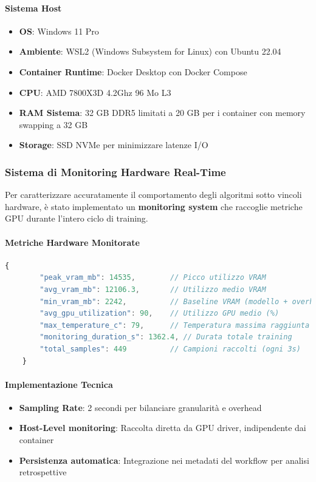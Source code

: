 \paragraph{Sistema Host}
\begin{itemize}
	\item \textbf{OS}: Windows 11 Pro
	\item \textbf{Ambiente}: WSL2 (Windows Subsystem for Linux) con Ubuntu 22.04
	\item \textbf{Container Runtime}: Docker Desktop con Docker Compose
	\item \textbf{CPU}: AMD 7800X3D 4.2Ghz 96 Mo L3 
	\item \textbf{RAM Sistema}: 32 GB DDR5 limitati a 20 GB per i container con memory swapping a 32 GB
	\item \textbf{Storage}: SSD NVMe per minimizzare latenze I/O
\end{itemize}

\subsubsection{Sistema di Monitoring Hardware Real-Time}
\label{subsubsec:monitoring_hardware}

Per caratterizzare accuratamente il comportamento degli algoritmi sotto vincoli hardware, è stato implementato un \textbf{monitoring system} che raccoglie metriche GPU durante l'intero ciclo di training.

\paragraph{Metriche Hardware Monitorate}
\begin{lstlisting}[language=JavaScript, caption=Esempio statistiche hardware raccolte]
	{
		"peak_vram_mb": 14535,        // Picco utilizzo VRAM
		"avg_vram_mb": 12106.3,       // Utilizzo medio VRAM
		"min_vram_mb": 2242,          // Baseline VRAM (modello + overhead)
		"avg_gpu_utilization": 90,    // Utilizzo GPU medio (%)
		"max_temperature_c": 79,      // Temperatura massima raggiunta
		"monitoring_duration_s": 1362.4, // Durata totale training
		"total_samples": 449          // Campioni raccolti (ogni 3s)
	}
\end{lstlisting}

\paragraph{Implementazione Tecnica}
\begin{itemize}
	\item \textbf{Sampling Rate}: 2 secondi per bilanciare granularità e overhead
	\item \textbf{Host-Level monitoring}: Raccolta diretta da GPU driver, indipendente dai container
	\item \textbf{Persistenza automatica}: Integrazione nei metadati del workflow per analisi retrospettive
\end{itemize}
\newpage
